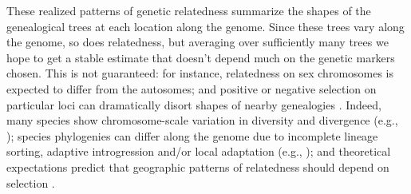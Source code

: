 \documentclass[11pt, oneside]{article}   	%
\newcommand\citet{\cite}
\newcommand\citep{\cite}
\begin{document}

These realized patterns of genetic relatedness
summarize the shapes of the genealogical trees %
at each location along the genome.
Since these trees vary along the genome, so does relatedness,
but averaging over sufficiently many trees we hope to get a stable estimate
that doesn't depend much on the genetic markers chosen.
This is not guaranteed:
for instance,
relatedness on sex chromosomes is expected to differ from the autosomes;
and positive or negative selection on particular loci can dramatically disort shapes of nearby genealogies
\citep{kim2002hitchhiking,charlesworth1993effect,barton2000genetic}.
Indeed,
many species show chromosome-scale variation in diversity and divergence
(e.g., \citep{langley2012genomic});
species phylogenies can differ along the genome 
due to incomplete lineage sorting,
adaptive introgression and/or local adaptation 
(e.g., \citet{pease2013accurate,ellegren2012genomic,nadeau2012genomic,pool2015natural,vernot2014resurrecting});
and theoretical expectations predict that geographic patterns of relatedness should depend on selection
\citep{charlesworth2003review}.
\end{document}
